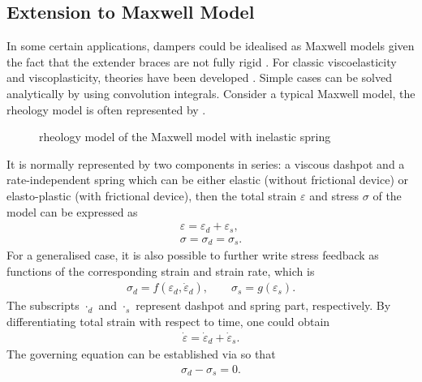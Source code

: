 \subsection{Extension to Maxwell Model}
In some certain applications, dampers could be idealised as Maxwell models given the fact that the extender braces are not fully rigid \cite{Makris1991}. For classic viscoelasticity and viscoplasticity, theories have been developed \cite{Simo1998}. Simple cases can be solved analytically by using convolution integrals. Consider a typical Maxwell model, the rheology model is often represented by .
\begin{figure}[ht]
\centering\scriptsize
{}
\caption{rheology model of the Maxwell model with inelastic spring}\label{fig:rheology_maxwell}
\end{figure}
It is normally represented by two components in series: a viscous dashpot and a rate-independent spring which can be either elastic (without frictional device) or elasto-plastic (with frictional device), then the total strain $\varepsilon$ and stress $\sigma$ of the model can be expressed as
\begin{gather}\label{eq:equal_strain}
\varepsilon=\varepsilon_d+\varepsilon_s,\\\label{eq:equal_stress}
\sigma=\sigma_d=\sigma_s.
\end{gather}
For a generalised case, it is also possible to further write stress feedback as functions of the corresponding strain and strain rate, which is
\begin{gather}
\sigma_d=f(\varepsilon_d,\dot\varepsilon_d),\qquad\sigma_s=g(\varepsilon_s).
\end{gather}
The subscripts $\cdot_d$ and $\cdot_s$ represent dashpot and spring part, respectively. By differentiating total strain with respect to time, one could obtain
\begin{gather}\label{eq:equal_strain_rate}
\dot\varepsilon=\dot\varepsilon_d+\dot\varepsilon_s.
\end{gather}
The governing equation can be established via  so that
\begin{gather}\label{eq:governing_equation}
\sigma_d-\sigma_s=0.
\end{gather}
